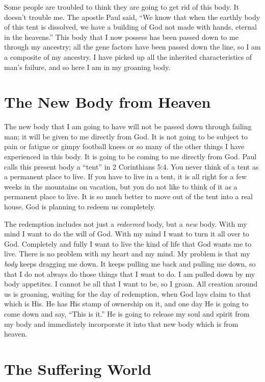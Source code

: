 Some people are troubled to think they are going to get 
rid of this body. It doesn’t trouble me. The apostle Paul said, 
“We know that when the earthly body of this tent is dissolved, we have a building of God not made with hands, 
eternal in the heavens.” This body that I now possess has 
been passed down to me through my ancestry; all the gene 
factors have been passed down the line, so I am a composite of my ancestry. I have picked up all the inherited characteristics of man’s failure, and so here I am in my groaning 
body.


\section*{The New Body from Heaven}

The new body that I am going to have will not be passed 
down through failing man; it will be given to me directly 
from God. It is not going to be subject to pain or fatigue 
or gimpy football knees or so many of the other things I 
have experienced in this body. It is going to be coming to me 
directly from God. Paul calls this present body a “tent” in 
2 Corinthians 5:4. You never think of a tent as a permanent 
place to live. If you have to live in a tent, it is all right for 
a few weeks in the mountains on vacation, but you do not 
like to think of it as a permanent place to live. It is so much 
better to move out of the tent into a real house. God is planning to redeem us completely.

The redemption includes not just a \emph{redeemed} body, but a 
\emph{new} body. With my mind I want to do the will of God. With 
my mind I want to turn it all over to God. Completely and 
fully I want to live the kind of life that God wants me to live. 
There is no problem with my heart and my mind. My problem is that
 my \emph{body} keeps dragging me down.
 It keeps pulling me back and pulling me down, so that I do not always 
do those things that I want to do. I am pulled down by my 
body appetites. I cannot be all that I want to be, so I groan. 
All creation around us is groaning, waiting for the day of 
redemption, when God lays claim to that which is His. He 
has His stamp of ownership on it, and one day He is going 
to come down and say, “This is it.” He is going to release my 
soul and spirit from my body and immediately incorporate 
it into that new body which is from heaven.


\section*{The Suffering World}

